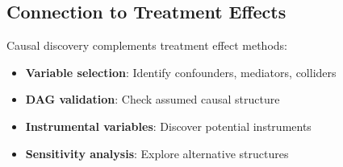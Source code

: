 \subsection{Connection to Treatment Effects}

Causal discovery complements treatment effect methods:
\begin{itemize}
    \item \textbf{Variable selection}: Identify confounders, mediators, colliders
    \item \textbf{DAG validation}: Check assumed causal structure
    \item \textbf{Instrumental variables}: Discover potential instruments
    \item \textbf{Sensitivity analysis}: Explore alternative structures
\end{itemize}

